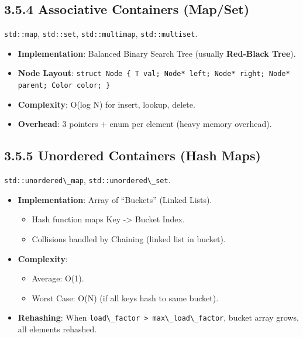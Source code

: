 \hypertarget{associative-containers-mapset}{%
\subsection{3.5.4 Associative Containers
(Map/Set)}\label{associative-containers-mapset}}

\passthrough{\lstinline!std::map!}, \passthrough{\lstinline!std::set!},
\passthrough{\lstinline!std::multimap!},
\passthrough{\lstinline!std::multiset!}.

\begin{itemize}
\tightlist
\item
  \textbf{Implementation}: Balanced Binary Search Tree (usually
  \textbf{Red-Black Tree}).
\item
  \textbf{Node Layout}:
  \passthrough{\lstinline!struct Node \{ T val; Node* left; Node* right; Node* parent; Color color; \}!}
\item
  \textbf{Complexity}: O(log N) for insert, lookup, delete.
\item
  \textbf{Overhead}: 3 pointers + enum per element (heavy memory
  overhead).
\end{itemize}

\hypertarget{unordered-containers-hash-maps}{%
\subsection{3.5.5 Unordered Containers (Hash
Maps)}\label{unordered-containers-hash-maps}}

\passthrough{\lstinline!std::unordered\_map!},
\passthrough{\lstinline!std::unordered\_set!}.

\begin{itemize}
\tightlist
\item
  \textbf{Implementation}: Array of ``Buckets'' (Linked Lists).

  \begin{itemize}
  \tightlist
  \item
    Hash function maps Key -\textgreater{} Bucket Index.
  \item
    Collisions handled by Chaining (linked list in bucket).
  \end{itemize}
\item
  \textbf{Complexity}:

  \begin{itemize}
  \tightlist
  \item
    Average: O(1).
  \item
    Worst Case: O(N) (if all keys hash to same bucket).
  \end{itemize}
\item
  \textbf{Rehashing}: When
  \passthrough{\lstinline!load\_factor > max\_load\_factor!}, bucket
  array grows, all elements rehashed.
\end{itemize}

